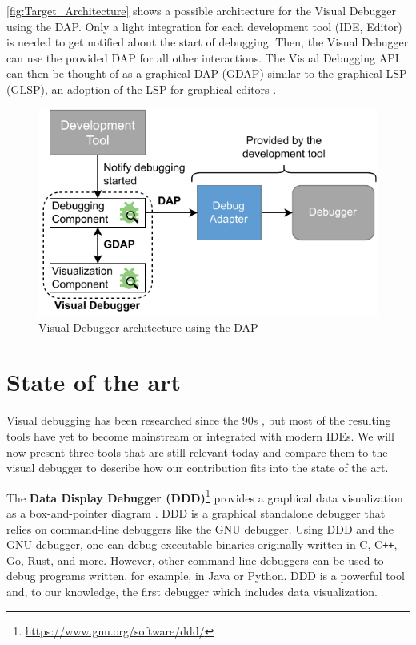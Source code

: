 \documentclass[sigconf]{acmart}
\begin{document}
\autoref{fig:Target_Architecture} shows a possible architecture for the Visual Debugger using the DAP.
Only a light integration for each development tool (IDE, Editor) is needed to get notified about the start of debugging.
Then, the Visual Debugger can use the provided DAP for all other interactions.
The Visual Debugging API can then be thought of as a graphical DAP (GDAP) similar to the graphical LSP (GLSP), an adoption of the LSP for graphical editors \cite{rodriguez-echeverriaLanguageServerProtocol2018,borkVisionFlexibleGLSPBased2024}.

\begin{figure}[ht]
  \centering
  \includegraphics[width=1\linewidth]{images/visual-debugger-Target-architecture.pdf}
  \caption{Visual Debugger architecture using the DAP}
  \label{fig:Target_Architecture}
\end{figure}

\section{State of the art} \label{sec:relatedWork}
Visual debugging has been researched since the 90s \cite{jerdingUsingVisualizationFoster1994, mukherjeaVisualDebuggingIntegrating1994, hansonSimpleExtensibleGraphical1997}, but most of the resulting tools have yet to become mainstream or integrated with modern IDEs.
We will now present three tools that are still relevant today and compare them to the visual debugger to describe how our contribution fits into the state of the art.

The \textbf{Data Display Debugger (DDD)}\footnote{\url{https://www.gnu.org/software/ddd/}} provides a graphical data visualization as a box-and-pointer diagram \cite{zellerDDDFreeGraphical1996}.
DDD is a graphical standalone debugger that relies on command-line debuggers like the GNU debugger.
Using DDD and the GNU debugger, one can debug executable binaries originally written in C, C\texttt{++}, Go, Rust, and more.
However, other command-line debuggers can be used to debug programs written, for example, in Java or Python.
DDD is a powerful tool and, to our knowledge, the first debugger which includes data visualization.
\end{document}
